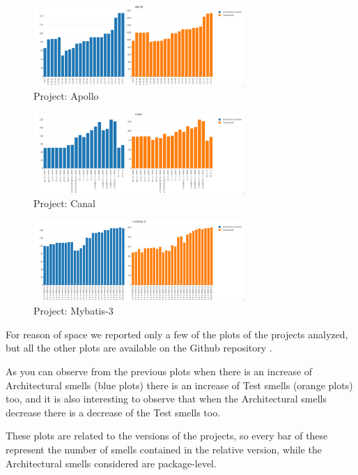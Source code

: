\begin{figure}[htp]
    \centering
    \includegraphics[width=8cm]{img/apollo.png}
    \caption{Project: Apollo}
    \label{fig:apollo}
\end{figure}
\begin{figure}[htp]
    \centering
    \includegraphics[width=8cm]{img/canal.png}
    \caption{Project: Canal}
    \label{fig:canal}
\end{figure}
\begin{figure}[htp]
    \centering
    \includegraphics[width=8cm]{img/mybatis-3.png}
    \caption{Project: Mybatis-3}
    \label{fig:mybatis-3}
\end{figure}

For reason of space we reported only a few of the plots of the projects analyzed, but all the other plots are available on the Github repository \cite{IEEEhowto:plotsR}. \par\hfill

As you can observe from the previous plots when there is an increase of Architectural smells (blue plots) there is an increase of Test smells (orange plots) too, and it is also interesting to observe that when the Architectural smells decrease there is a decrease of the Test smells too.\par\hfill

These plots are related to the versions of the projects, so every bar of these represent the number of smells contained in the relative version, while the Architectural smells considered are package-level.\par\hfill

